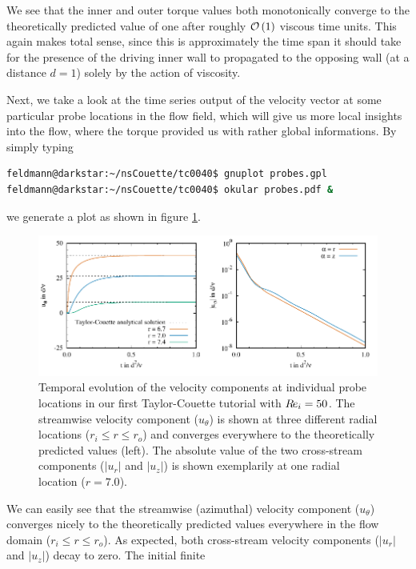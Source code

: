 \documentclass[a4paper, 11pt, DIV=11]{scrartcl}
\begin{document}
We see that the inner and outer torque values both monotonically converge to the 
theoretically predicted value of one after roughly $\mathcal{O}\left(1\right)$ 
viscous time units. This again makes total sense, since this is approximately 
the time span it should take for the presence of the driving inner wall to 
propagated to the opposing wall (at a distance $d=1$) solely by the action of 
viscosity. %
\par
Next, we take a 
look at the time series output of the velocity vector at some particular probe 
locations in the flow field, which will give us more local insights into the 
flow, where the torque provided us with rather global informations. By simply 
typing
\begin{lstlisting}[language=bash]
feldmann@darkstar:~/nsCouette/tc0040$ gnuplot probes.gpl
feldmann@darkstar:~/nsCouette/tc0040$ okular probes.pdf &
\end{lstlisting}
we generate a plot as shown in figure \ref{fig:tc0040probes}.
\begin{figure}[htb]
\centering
\includegraphics[scale=1.00]{figures/tc0040/probes}
\caption{Temporal evolution of the velocity components at individual probe 
locations in our first Taylor-Couette tutorial  with $R\hspace{-0.1em}e_{i}=\num{50}$.
The streamwise velocity component ($u_{\theta}$) is shown 
at three different radial locations ($r_{i}\le r\le r_{o}$) and converges 
everywhere to the theoretically predicted values (left). The absolute value of
the two cross-stream components ($|u_r|$ and $|u_z|$) is shown exemplarily at
one radial location ($r=\num{7.0}$).}
\label{fig:tc0040probes}
\end{figure}
We can easily see that the streamwise (azimuthal) velocity component 
($u_{\theta}$) converges nicely to the theoretically predicted values everywhere 
in the flow domain ($r_{i}\le r\le r_{o}$). As expected, both cross-stream 
velocity components ($|u_r|$ and $|u_z|$) decay to zero. The initial finite 
\end{document}
